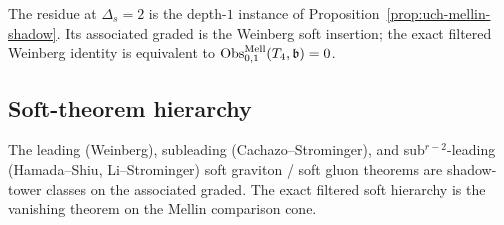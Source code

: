 \begin{remark}
\label{rem:uch-weinberg-identification}
The residue at $\Delta_s=2$ is the depth-$1$ instance of
Proposition~\ref{prop:uch-mellin-shadow}. Its associated graded is the
Weinberg soft insertion; the exact filtered Weinberg identity is
equivalent to
$\operatorname{Obs}^{\mathrm{Mell}}_{0,1}(T_4,\mathfrak b)=0$.
\end{remark}

\subsection{Soft-theorem hierarchy}
\label{subsec:uch-soft}

The leading (Weinberg), subleading (Cachazo--Strominger), and
sub${}^{r-2}$-leading (Hamada--Shiu, Li--Strominger) soft graviton /
soft gluon theorems are shadow-tower classes on the associated
graded. The exact filtered soft hierarchy is the vanishing theorem on
the Mellin comparison cone.


